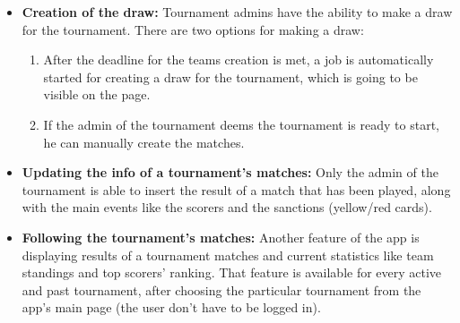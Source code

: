 \begin{itemize}
    \item \textbf{Creation of the draw:}
        Tournament admins have the ability to make a draw for the tournament. There are two options for making a draw:
        \begin{enumerate}
            \item After the deadline for the teams creation is met, a job is automatically started for creating a draw for the tournament, which is going to be visible on the page.
            \item If the admin of the tournament deems the tournament is ready to start, he can manually create the matches.
        \end{enumerate}

    \item \textbf{Updating the info of a tournament's matches:}
        Only the admin of the tournament is able to insert the result of a match that has been played, along with the main events like the scorers and the sanctions (yellow/red cards).

    \item \textbf{Following the tournament's matches:}
        Another feature of the app is displaying results of a tournament matches and current statistics like team standings and top scorers' ranking. That feature is available for every active and past tournament, after choosing the particular tournament from the app's main page (the user don't have to be logged in).

\end{itemize}
\newpage
